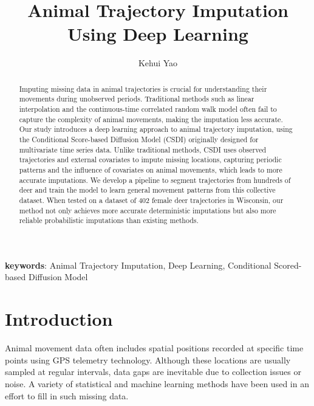 \documentclass[11pt]{article}
\title{Animal Trajectory Imputation Using Deep Learning}
\author[1]{Kehui Yao}
\affil[1]{Department of Statistics, University of Wisconsin-Madison}
\date{}
\begin{document}
\maketitle

\begin{abstract}
Imputing missing data in animal trajectories is crucial for understanding their movements during unobserved periods. Traditional methods such as linear interpolation and the continuous-time correlated random walk model often fail to capture the complexity of animal movements, making the imputation less accurate. Our study introduces a deep learning approach to animal trajectory imputation, using the Conditional Score-based Diffusion Model (CSDI) originally designed for multivariate time series data. Unlike traditional methods, CSDI uses observed trajectories and external covariates to impute missing locations, capturing periodic patterns and the influence of covariates on animal movements, which leads to more accurate imputations. We develop a pipeline to segment trajectories from hundreds of deer and train the model to learn general movement patterns from this collective dataset. When tested on a dataset of 402 female deer trajectories in Wisconsin, our method not only achieves more accurate deterministic imputations but also more reliable probabilistic imputations than existing methods.

\end{abstract}

\textbf{keywords}: Animal Trajectory Imputation, Deep Learning, Conditional Scored-based Diffusion Model
\section{Introduction}
Animal movement data often includes spatial positions recorded at specific time points using GPS telemetry technology. Although these locations are usually sampled at regular intervals, data gaps are inevitable due to collection issues or noise. A variety of statistical and machine learning methods have been used in an effort to fill in such missing data.
\end{document}
